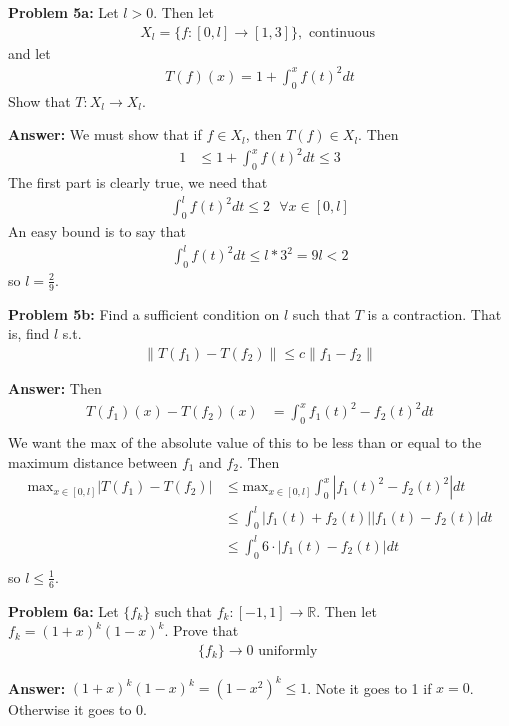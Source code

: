 \documentclass{article}
\newcommand*{\txt}[1]{\text{ #1 }}%
\newcommand*{\fora}{\txt{}\forall}%
\newcommand*{\rr}{\mathbb{R}}%
\begin{document}
\textbf{Problem 5a:} Let $l>0$. Then let \begin{align*}
    X_l=\{f:[0,l]\to [1,3]\}, \txt{continuous}
\end{align*} and let \begin{align*}
    T(f)(x)=1+\int_{0}^{x}f(t)^2dt
\end{align*} Show that $T:X_l\to X_l$.

\textbf{Answer:} We must show that if $f\in X_l$, then $T(f)\in X_l$. Then \begin{align*}
    1&\leq 1+\int_{0}^{x}f(t)^2dt\leq 3
\end{align*} The first part is clearly true, we need that \begin{align*}
    \int_{0}^{l}f(t)^2dt\leq 2\fora x\in [0,l]
\end{align*} An easy bound is to say that \begin{align*}
    \int_{0}^{l}f(t)^2dt\leq l*3^2=9l<2
\end{align*} so $l=\frac{2}{9}$.

\textbf{Problem 5b:} Find a sufficient condition on $l$ such that $T$ is a contraction. That is, find $l$ s.t. \begin{align*}
    \|T(f_1)-T(f_2)\|\leq c\|f_1-f_2\|
\end{align*}

\textbf{Answer:} Then \begin{align*}
    T(f_1)(x)-T(f_2)(x)&=\int_{0}^{x}f_1(t)^2-f_2(t)^2dt\\
\end{align*} We want the max of the absolute value of this to be less than or equal to the maximum distance between $f_1$ and $f_2$. Then \begin{align*}
    \text{max}_{x\in [0,l]}|T(f_1)-T(f_2)|&\leq \text{max}_{x\in [0,l]}\int_{0}^{x}|f_1(t)^2-f_2(t)^2|dt\\
    &\leq \int_{0}^{l}|f_1(t)+f_2(t)||f_1(t)-f_2(t)|dt\\
    &\leq \int_{0}^{l}6\cdot |f_1(t)-f_2(t)|dt\\
\end{align*} so $l\leq \frac{1}{6}$.

\textbf{Problem 6a:} Let $\{f_k\}$ such that $f_k:[-1,1]\to \rr$. Then let $f_k=(1+x)^k(1-x)^k$. Prove that \begin{align*}
    \{f_k\}\to 0\txt{uniformly}
\end{align*}

\textbf{Answer:} $(1+x)^k(1-x)^k=(1-x^2)^k\leq 1$. Note it goes to 1 if $x=0$. Otherwise it goes to 0.
\end{document}
